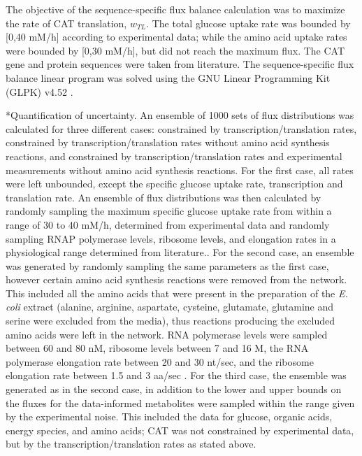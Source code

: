 \documentclass[12pt]{article}
\makeatletter
\renewcommand\subsubsection{\@startsection
	{subsubsection}{2}{0mm}
	{-0.05in}
	{-0.5\baselineskip}
	{\normalfont\normalsize\itshape}}
\makeatother
\begin{document}
The objective of the sequence-specific flux balance calculation was to maximize the rate of CAT translation, $w_{TL}$.
The total glucose uptake rate was bounded by [0,40 mM/h] according to experimental data;
while the amino acid uptake rates were bounded by [0,30 mM/h], but did not reach the maximum flux.
The CAT gene and protein sequences were taken from literature.
The sequence-specific flux balance linear program was solved using the GNU Linear Programming Kit (GLPK) v4.52 \cite{GLPK}.


\subsubsection*{Quantification of uncertainty.}
An ensemble of 1000 sets of flux distributions was calculated for three different cases:  constrained by transcription/translation rates, constrained by transcription/translation rates without amino acid synthesis reactions, and constrained by transcription/translation rates and experimental measurements without amino acid synthesis reactions.
For the first case, all rates were left unbounded, except the specific glucose uptake rate, transcription and translation rate.
An ensemble of flux distributions was then calculated by randomly sampling the maximum specific glucose uptake rate from within a range of 30 to 40 mM/h, determined from experimental data and randomly sampling RNAP polymerase levels, ribosome levels, and elongation rates in a physiological range determined from literature..
For the second case, an ensemble was generated by randomly sampling the same parameters as the first case, however certain amino acid synthesis reactions were removed from the network.
This included all the amino acids that were present in the preparation of the \textit{E. coli} extract (alanine, arginine, aspartate, cysteine, glutamate, glutamine and serine were excluded from the media), thus reactions producing the excluded amino acids were left in the network. 
RNA polymerase levels were sampled between 60 and 80 nM, ribosome levels between 7 and 16 \textmu M, the RNA polymerase elongation rate between 20 and 30 nt/sec, and the ribosome elongation rate between 1.5 and 3 aa/sec \cite{2005_underwood_biotech, Garamella:2016aa}.
For the third case, the ensemble was generated as in the second case, in addition to the lower and upper bounds on the fluxes for the data-informed metabolites were sampled within the range given by the experimental noise.
This included the data for glucose, organic acids, energy species, and amino acids; CAT was not constrained by experimental data, but by the transcription/translation rates as stated above.
\end{document}
